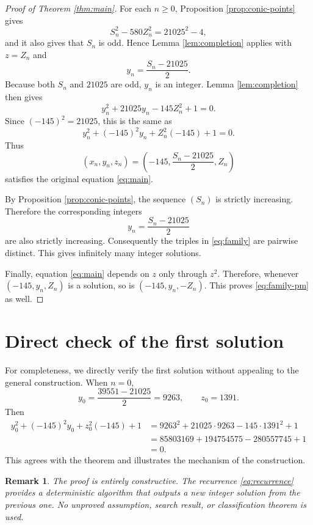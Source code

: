 \documentclass[11pt]{article}
\numberwithin{equation}{section}
\newtheorem{remark}[theorem]{Remark}
\begin{document}
\begin{proof}[Proof of Theorem \ref{thm:main}]
For each $n\geq 0$, Proposition \ref{prop:conic-points} gives
\begin{equation*}
        S_n^2-580Z_n^2=21025^2-4,
\end{equation*}
and it also gives that $S_n$ is odd. Hence Lemma \ref{lem:completion} applies
with $z=Z_n$ and
\begin{equation*}
        y_n=\frac{S_n-21025}{2}.
\end{equation*}
Because both $S_n$ and $21025$ are odd, $y_n$ is an integer. Lemma
\ref{lem:completion} then gives
\begin{equation*}
        y_n^2+21025y_n-145Z_n^2+1=0.
\end{equation*}
Since $(-145)^2=21025$, this is the same as
\begin{equation*}
        y_n^2+(-145)^2y_n+Z_n^2(-145)+1=0.
\end{equation*}
Thus
\begin{equation*}
        (x_n,y_n,z_n)=\left(-145,\frac{S_n-21025}{2},Z_n\right)
\end{equation*}
satisfies the original equation \eqref{eq:main}.

By Proposition \ref{prop:conic-points}, the sequence $(S_n)$ is strictly
increasing. Therefore the corresponding integers
\begin{equation*}
        y_n=\frac{S_n-21025}{2}
\end{equation*}
are also strictly increasing. Consequently the triples in \eqref{eq:family} are
pairwise distinct. This gives infinitely many integer solutions.

Finally, equation \eqref{eq:main} depends on $z$ only through $z^2$. Therefore,
whenever $(-145,y_n,Z_n)$ is a solution, so is $(-145,y_n,-Z_n)$. This proves
\eqref{eq:family-pm} as well.
\end{proof}

\section{Direct check of the first solution}

For completeness, we directly verify the first solution without appealing to
the general construction. When $n=0$,
\begin{equation*}
        y_0=\frac{39551-21025}{2}=9263,
        \qquad
        z_0=1391.
\end{equation*}
Then
\begin{align*}
        y_0^2+(-145)^2y_0+z_0^2(-145)+1
        &=9263^2+21025\cdot 9263-145\cdot 1391^2+1\\
        &=85803169+194754575-280557745+1\\
        &=0.
\end{align*}
This agrees with the theorem and illustrates the mechanism of the construction.

\begin{remark}
The proof is entirely constructive. The recurrence \eqref{eq:recurrence}
provides a deterministic algorithm that outputs a new integer solution from the
previous one. No unproved assumption, search result, or classification theorem
is used.
\end{remark}
\end{document}
